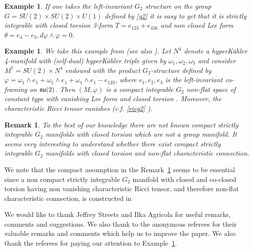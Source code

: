 \documentclass[10pt,british]{article}
\newtheorem{rmrk}[thrm]{Remark}
\newtheorem{exam}[thrm]{Example}
\def\p{{\varphi}}
\begin{document}
\begin{exam}
If one takes the left-invariant $G_2$ structure on  the group $G=SU(2)\times SU(2)\times U(1)$ defined by  \eqref{g2} it is easy to get that it is strictly integrable with closed torsion 3-form $T=e_{123}+e_{456}$ and non closed Lee form $\theta=e_4-e_3, d\p\wedge\p=0$. 
\end{exam}
\begin{exam}\label{noflate} We take this example from \cite{PP} (see also \cite[Example~6.4]{FF}). Let $N^4$ denote a hyperK\"ahler 4-manifold with (self-dual) hyperK\"ahler triple given by $\omega_1,\omega_2,\omega_3$ and consider $M^7 = SU(2)\times N^4$ endowed with the product $G_2$-structure defined by $\p=\omega_1\wedge e_1+\omega_1\wedge e_1+\omega_1\wedge e_1-e_{123}$, where $e_1,e_2,e_3$ is the  left-invariant co-framing on $\frak{su}(2)$. Then $(M,\p)$ is a compact integrable $G_2$ non-flat space of constant type with vanishing Lee form and closed torsion \cite{PP}. Moreover, the characteristic Ricci tensor  vanishes \cite[Example~6.4]{FF} (c.f.  \eqref{ricg2} ).
\end{exam}
\begin{rmrk}\label{rrrr} {\rm To the best of our knowledge there are not known  compact  strictly integrable $G_2$ manifolds with closed torsion which are not a group manifold. It seems  very interesting to understand whether there exist compact  strictly integrable  $G_2$ manifolds with closed torsion and  non-flat characteristic connection.}
\end{rmrk}
We note that the compact assumption in the Remark~\ref{rrrr} seems to be essential since a non compact strictly integrable $G_2$ manifold with closed and co-closed torsion having non vanishing characteristic Ricci tensor, and therefore non-flat characteristic connection,  is constructed in \cite[Example~7.1]{FF}



\vskip 0.5cm
 \vskip 0.1cm
\noindent %
We would like to thank Jeffrey Streets and Ilka Agricola for   useful remarks, comments and suggestions. We also thank to the anonymous referees for their valuable remarks and comments  which help us to improve the paper. We also thank the referees for paying our attention to Example~\ref{noflate}.
\end{document}
